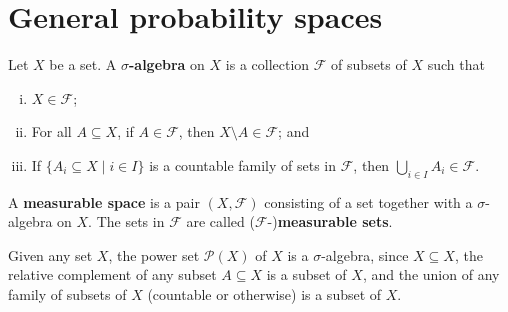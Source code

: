 \section{General probability spaces}

\incomplete

\todo{}

\begin{definition}
\label{defSigmaAlgebra}
Let $X$ be a set. A \textbf{$\sigma$-algebra} on $X$ is a collection $\mathcal{F}$  of subsets of $X$ such that
\begin{enumerate}[(i)]
\item $X \in \mathcal{F}$;
\item For all $A \subseteq X$, if $A \in \mathcal{F}$, then $X \setminus A \in \mathcal{F}$; and
\item If $\{ A_i \subseteq X \mid i \in I \}$ is a countable family of sets in $\mathcal{F}$, then $\bigcup_{i \in I} A_i \in \mathcal{F}$.
\end{enumerate}
A \textbf{measurable space} is a pair $(X, \mathcal{F})$ consisting of a set together with a $\sigma$-algebra on $X$. The sets in $\mathcal{F}$ are called ($\mathcal{F}$-)\textbf{measurable sets}.
\end{definition}

\begin{example}
\label{exPowerSetIsSigmaAlgebra}
Given any set $X$, the power set $\mathcal{P}(X)$ of $X$ is a $\sigma$-algebra, since $X \subseteq X$, the relative complement of any subset $A \subseteq X$ is a subset of $X$, and the union of any family of subsets of $X$ (countable or otherwise) is a subset of $X$.
\end{example}

